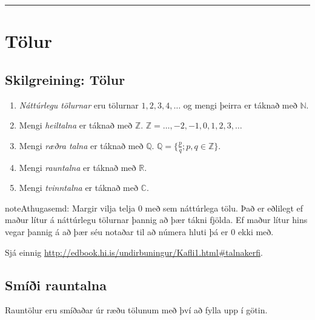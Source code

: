 \documentclass[a4paper,10pt,icelandic]{sphinxmanual}
\begin{document}
\bigskip\hrule{}\bigskip



\section{Tölur}
\label{kafli01:tolur}

\subsection{Skilgreining: Tölur}
\label{kafli01:index-0}\label{kafli01:skilgreining-tolur}\begin{enumerate}
\item {} 
\textit{Náttúrlegu tölurnar} eru tölurnar \(1, 2, 3, 4, \ldots\) og
mengi þeirra er táknað með \(\mathbb{N}\).

\item {} 
Mengi \textit{heiltalna} er táknað með \(\mathbb{Z}\).
\(\mathbb{Z}= \ldots,-2,-1,0,1,2,3,\ldots\)

\item {} 
Mengi \textit{ræðra talna} er táknað með \(\mathbb{Q}\).
\(\mathbb{Q}= \{ \frac pq ; p,q \in \mathbb{Z}\}\).

\item {} 
Mengi \textit{rauntalna} er táknað með \(\mathbb{R}\).

\item {} 
Mengi \textit{tvinntalna} er táknað með \(\mathbb{C}\).

\end{enumerate}

\begin{notice}{note}{Athugasemd:}
Margir vilja telja \(0\) með sem náttúrlega tölu. Það
er eðlilegt ef maður lítur á náttúrlegu tölurnar þannig að þær tákni
fjölda. Ef maður lítur hins vegar þannig á að þær séu notaðar til að
númera hluti þá er 0 ekki með.
\end{notice}

Sjá einnig \href{http://edbook.hi.is/undirbuningur/Kafli1.html\#talnakerfi}{http://edbook.hi.is/undirbuningur/Kafli1.html\#talnakerfi}.


\subsection{Smíði rauntalna}
\label{kafli01:smii-rauntalna}
Rauntölur eru smíðaðar úr ræðu tölunum með því að
fylla upp í götin.
\end{document}
